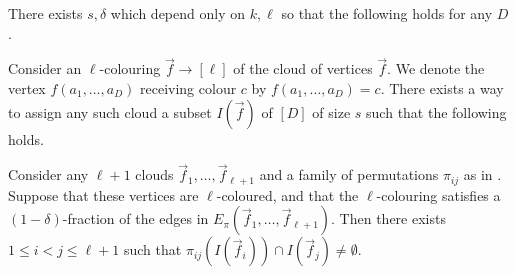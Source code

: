 \documentclass[a4paper,11pt, DIV=11]{scrartcl}
\theoremstyle{plain}
\theoremstyle{definition}
\begin{document}
\begin{lemma}\label{lem:technical}
    There exists $s, \delta$ which depend only on $k, \ell$ so that the following holds for any $D$.
    
    Consider an $\ell$-colouring $\vec{f} \to [\ell]$ of the cloud of vertices $\vec{f}$. We denote the vertex $f(a_1, \ldots, a_D)$ receiving colour $c$ by $f(a_1, \ldots, a_D) = c$. There exists a way to assign any such cloud a subset $I(\vec{f})$ of $[D]$ of size $s$ such that the following holds.

    Consider any $\ell + 1$ clouds $\vec{f}_1, \ldots, \vec{f}_{\ell + 1}$ and a family of permutations $\pi_{ij}$ as in . Suppose that these vertices are $\ell$-coloured, and that the $\ell$-colouring satisfies a $(1 - \delta)$-fraction of the edges in $E_\pi(\vec{f}_1, \ldots, \vec{f}_{\ell + 1})$. Then there exists $1 \leq i < j \leq \ell + 1$ such that $\pi_{ij}(I(\vec{f}_i)) \cap I(\vec{f}_j) \neq \emptyset$.
\end{lemma}
\end{document}
